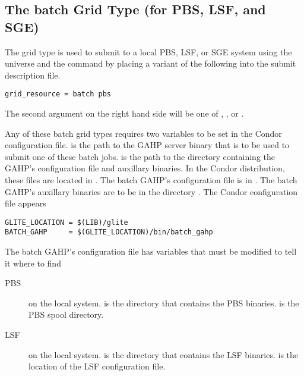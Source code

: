 \subsection{\label{sec:batch}The batch Grid Type (for PBS, LSF, and SGE) }
\label{sec:PBS}
\label{sec:LSF}
\label{sec:SGE}

The  grid type is used to submit to a local PBS, LSF, or SGE
system using the  universe and the
 command by placing a variant of the following
into the submit description file.
\begin{verbatim}
grid_resource = batch pbs
\end{verbatim}

The second argument on the right hand side will be one of
, , or .

Any of these batch grid types requires two variables to be set in the Condor
configuration file.
 is the path to the GAHP server binary that is to be
used to submit one of these batch jobs.
 is the path to the directory containing the GAHP's
configuration file and auxillary binaries.
In the Condor distribution, these files are located in 
.
The batch GAHP's configuration file is in
.
The batch GAHP's auxillary binaries
are to be in the directory .
The Condor configuration file appears

\footnotesize
\begin{verbatim}
GLITE_LOCATION = $(LIB)/glite
BATCH_GAHP     = $(GLITE_LOCATION)/bin/batch_gahp
\end{verbatim}
\normalsize

The batch GAHP's configuration file has variables that must be
modified to tell it where to find 
\begin{description}
\item[PBS] on the local system.
   is the directory that contains the PBS binaries.
   is the PBS spool directory.
\item[LSF] on the local system.
   is the directory that contains the LSF binaries.
   is the location of the LSF configuration file.
\end{description}

